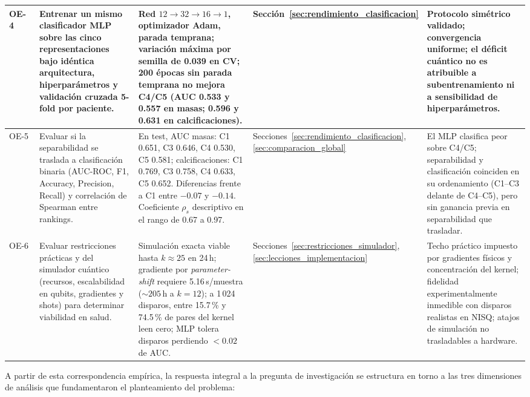 \begin{table}[htbp]
\begin{adjustbox}{max width=\linewidth}
\begin{tabular}{p{0.07\linewidth} p{0.24\linewidth} p{0.31\linewidth} p{0.14\linewidth} p{0.24\linewidth}}
\midrule
OE-4 & Entrenar un mismo clasificador MLP sobre las cinco representaciones bajo idéntica arquitectura, hiperparámetros y validación cruzada 5-fold por paciente. & Red $12 \to 32 \to 16 \to 1$, optimizador Adam, parada temprana; variación máxima por semilla de 0.039 en CV; 200 épocas sin parada temprana no mejora C4/C5 (AUC 0.533 y 0.557 en masas; 0.596 y 0.631 en calcificaciones). & Sección~\ref{sec:rendimiento_clasificacion} & Protocolo simétrico validado; convergencia uniforme; el déficit cuántico no es atribuible a subentrenamiento ni a sensibilidad de hiperparámetros. \\
\midrule
OE-5 & Evaluar si la separabilidad se traslada a clasificación binaria (AUC-ROC, F1, Accuracy, Precision, Recall) y correlación de Spearman entre rankings. & En test, AUC masas: C1 0.651, C3 0.646, C4 0.530, C5 0.581; calcificaciones: C1 0.769, C3 0.758, C4 0.633, C5 0.652. Diferencias frente a C1 entre $-0.07$ y $-0.14$. Coeficiente $\rho_s$ descriptivo en el rango de 0.67 a 0.97. & Secciones~\ref{sec:rendimiento_clasificacion}, \ref{sec:comparacion_global} & El MLP clasifica peor sobre C4/C5; separabilidad y clasificación coinciden en su ordenamiento (C1--C3 delante de C4--C5), pero sin ganancia previa en separabilidad que trasladar. \\
\midrule
OE-6 & Evaluar restricciones prácticas y del simulador cuántico (recursos, escalabilidad en qubits, gradientes y shots) para determinar viabilidad en salud. & Simulación exacta viable hasta $k \approx 25$ en 24\,h; gradiente por \textit{parameter-shift} requiere 5.16\,s/muestra ($\sim 205$\,h a $k = 12$); a 1\,024 disparos, entre 15.7\,\% y 74.5\,\% de pares del kernel leen cero; MLP tolera disparos perdiendo $< 0.02$ de AUC. & Secciones~\ref{sec:restricciones_simulador}, \ref{sec:lecciones_implementacion} & Techo práctico impuesto por gradientes físicos y concentración del kernel; fidelidad experimentalmente inmedible con disparos realistas en NISQ; atajos de simulación no trasladables a hardware. \\
\bottomrule
\end{tabular}
\end{adjustbox}
\end{table}

A partir de esta correspondencia empírica, la respuesta integral a la pregunta de investigación se estructura
en torno a las tres dimensiones de análisis que fundamentaron el planteamiento del problema:

